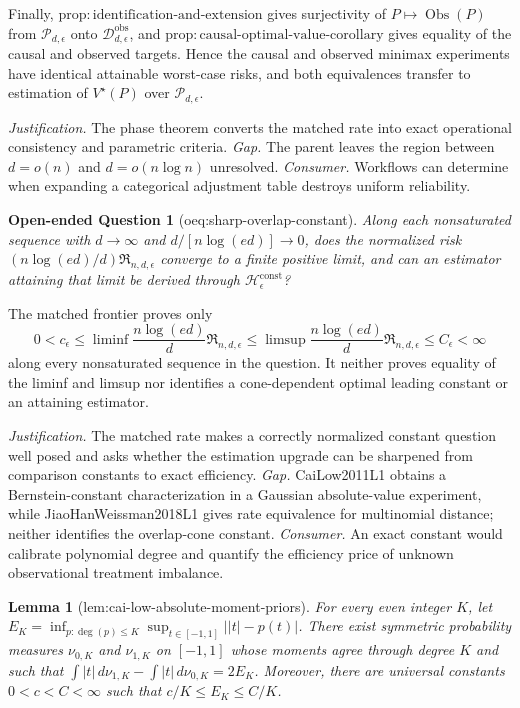 \documentclass{article}
\newtheorem{lemma}{Lemma}
\newtheorem{openendedquestion}{Open-ended Question}
\begin{document}
Finally, \(\mathrm{prop:identification\mbox{-}and\mbox{-}extension}\) gives surjectivity of \(P\mapsto\operatorname{Obs}(P)\) from \(\mathcal P_{d,\epsilon}\) onto \(\mathcal D_{d,\epsilon}^{\mathrm{obs}}\), and \(\mathrm{prop:causal\mbox{-}optimal\mbox{-}value\mbox{-}corollary}\) gives equality of the causal and observed targets.  Hence the causal and observed minimax experiments have identical attainable worst-case risks, and both equivalences transfer to estimation of \(V^\star(P)\) over \(\mathcal P_{d,\epsilon}\).
\par\smallskip\noindent \textit{Justification.} The phase theorem converts the matched rate into exact operational consistency and parametric criteria. \textit{Gap.} The parent leaves the region between \(d=o(n)\) and \(d=o(n\log n)\) unresolved. \textit{Consumer.} Workflows can determine when expanding a categorical adjustment table destroys uniform reliability.

\begin{openendedquestion}[oeq:sharp-overlap-constant]\label{oeq:sharp-overlap-constant}
Along each nonsaturated sequence with \(d\to\infty\) and \(d/[n\log(ed)]\to0\), does the normalized risk \((n\log(ed)/d)\mathfrak R_{n,d,\epsilon}\) converge to a finite positive limit, and can an estimator attaining that limit be derived through \(\mathscr H_\epsilon^{\mathrm{const}}\)?
\end{openendedquestion}
The matched frontier proves only
\[
 0<c_\epsilon\leq\liminf\frac{n\log(ed)}d\mathfrak R_{n,d,\epsilon}
 \leq\limsup\frac{n\log(ed)}d\mathfrak R_{n,d,\epsilon}\leq C_\epsilon<\infty
\]
along every nonsaturated sequence in the question.  It neither proves equality of the liminf and limsup nor identifies a cone-dependent optimal leading constant or an attaining estimator.
\par\smallskip\noindent \textit{Justification.} The matched rate makes a correctly normalized constant question well posed and asks whether the estimation upgrade can be sharpened from comparison constants to exact efficiency. \textit{Gap.} CaiLow2011L1 obtains a Bernstein-constant characterization in a Gaussian absolute-value experiment, while JiaoHanWeissman2018L1 gives rate equivalence for multinomial distance; neither identifies the overlap-cone constant. \textit{Consumer.} An exact constant would calibrate polynomial degree and quantify the efficiency price of unknown observational treatment imbalance.

\begin{lemma}[lem:cai-low-absolute-moment-priors]\label{lem:cai-low-absolute-moment-priors}
For every even integer \(K\), let \(E_K=\inf_{p:\deg(p)\leq K}\sup_{t\in[-1,1]}\lvert\lvert t\rvert-p(t)\rvert\).  There exist symmetric probability measures \(\nu_{0,K}\) and \(\nu_{1,K}\) on \([-1,1]\) whose moments agree through degree \(K\) and such that \(\int\lvert t\rvert\,d\nu_{1,K}-\int\lvert t\rvert\,d\nu_{0,K}=2E_K\).  Moreover, there are universal constants \(0<c<C<\infty\) such that \(c/K\leq E_K\leq C/K\).
\end{lemma}
\end{document}
